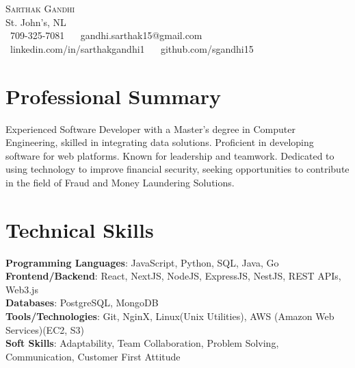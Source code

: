\documentclass[letterpaper,11pt]{article}
\begin{document}
\begin{center}
    {\Huge \scshape Sarthak Gandhi} \\ \vspace{1pt}
    St. John's, NL \\ \vspace{1pt}
    \small \raisebox{-0.1\height}\faPhone\ 709-325-7081 ~ 
    {\raisebox{-0.2\height}\faEnvelope\  {gandhi.sarthak15@gmail.com}} ~ 
    {\raisebox{-0.2\height}\faLinkedin\ {linkedin.com/in/sarthakgandhi1}}  ~
    {\raisebox{-0.2\height}\faGithub\ {github.com/sgandhi15}}
    \vspace{-8pt}
\end{center}


\section{Professional Summary}
Experienced Software Developer with a Master’s degree in Computer Engineering, skilled in integrating data solutions. Proficient in developing software for web platforms. Known for leadership and teamwork. Dedicated to using technology to improve financial security, seeking opportunities to contribute in the field of Fraud and Money Laundering Solutions.
\vspace{-8pt}

\section{Technical Skills}
\begin{itemize}[leftmargin=0.15in, label={}]
\small{\item{
\textbf{Programming Languages}{: JavaScript, Python, SQL, Java, Go} \\
\textbf{Frontend/Backend}{: React, NextJS, NodeJS, ExpressJS, NestJS, REST APIs, Web3.js} \\
\textbf{Databases}{: PostgreSQL, MongoDB} \\
\textbf{Tools/Technologies}{: Git, NginX, Linux(Unix Utilities), AWS (Amazon Web Services)(EC2, S3)} \\
\textbf{Soft Skills}{: Adaptability, Team Collaboration, Problem Solving, Communication, Customer First Attitude} \\
}}
\end{itemize}
\vspace{-16pt}
\end{document}
